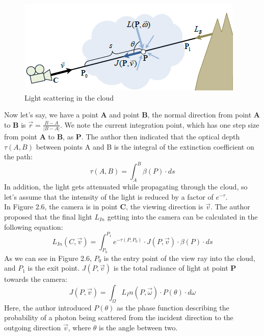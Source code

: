 \begin{figure}[htp]
\begin{center}
\includegraphics[scale=1.0]{images/scatteringscene.png}
\caption{Light scattering in the cloud}
\label{f6}
\end{center}
\end{figure}

Now let's say, we have a point \textbf{A} and point \textbf{B}, the normal direction from point \textbf{A} to \textbf{B} is $\overrightarrow{r} = \frac{B-A}{|B-A|}$. We note the current integration point, which has one step size from point \textbf{A} to \textbf{B}, as \textbf{P}.
The author then indicated that the optical depth $\tau(A, B)$ between points A and B is the integral of the extinction coefficient on the path:
\begin{equation}
\tau(A, B) = \int_{A}^{B}\beta(P)\cdot ds
\end{equation}
In addition, the light gets attenuated while propagating through the cloud, so let's assume that the intensity of the light is reduced by a factor of $e^{-\tau}$.\\
In Figure 2.6, the camera is in point \textbf{C}, the viewing direction is $\overrightarrow{v}$. The author proposed that the final light $L_{In}$ getting into the camera can be calculated in the following equation:
\begin{equation}
L_{In}(C, \overrightarrow{v}) = \int_{P_0}^{P_1}e^{-\tau(P, P_0)} \cdot J(P, \overrightarrow{v}) \cdot \beta(P) \cdot ds
\end{equation}
As we can see in Figure 2.6, $P_0$ is the entry point of the view ray into the cloud, and $P_1$ is the exit point. $J(P, \overrightarrow{v})$ is the total radiance of light at point \textbf{P} towards the camera:
\begin{equation}
J(P, \overrightarrow{v}) = \int_{\Omega}L_In(P, \overrightarrow{\omega}) \cdot P(\theta) \cdot d\omega
\end{equation}
Here, the author introduced $P(\theta)$ as the phase function describing the probability of a photon being scattered from the incident direction to the outgoing direction $\overrightarrow{v}$, where $\theta$ is the angle between two.
